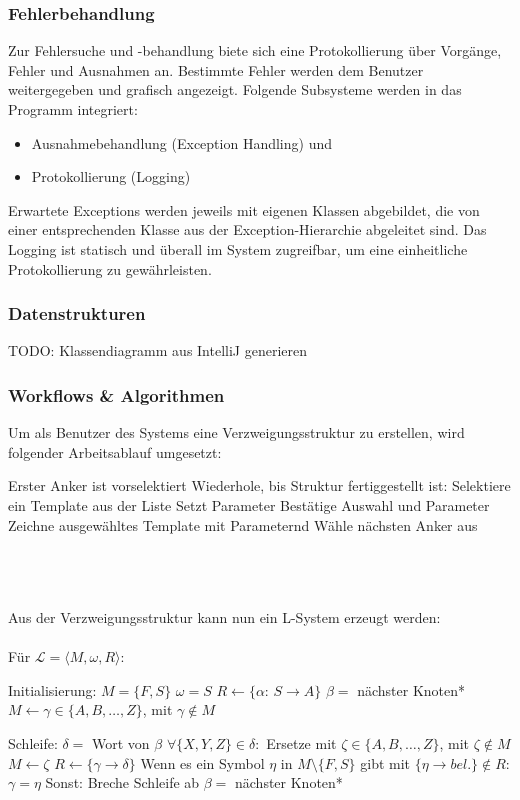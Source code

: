 \subsubsection{Fehlerbehandlung}
Zur Fehlersuche und -behandlung biete sich eine Protokollierung über Vorgänge, Fehler und Ausnahmen an.
Bestimmte Fehler werden dem Benutzer weitergegeben und grafisch angezeigt.
Folgende Subsysteme werden in das Programm integriert:
\begin{itemize}
    \item Ausnahmebehandlung (Exception Handling) und
    \item Protokollierung (Logging)
\end{itemize}
Erwartete Exceptions werden jeweils mit eigenen Klassen abgebildet, die von einer entsprechenden Klasse aus der
Exception-Hierarchie abgeleitet sind.
Das Logging ist statisch und überall im System zugreifbar, um eine einheitliche Protokollierung zu gewährleisten.

\subsubsection{Datenstrukturen}
TODO: Klassendiagramm aus IntelliJ generieren

\subsubsection{Workflows \& Algorithmen}
Um als Benutzer des Systems eine Verzweigungsstruktur zu erstellen, wird folgender Arbeitsablauf umgesetzt:
\begin{algorithm}[caption={Erstellen einer Verzweigungsstruktur}, label={alg1}]
    Erster Anker ist vorselektiert
    Wiederhole, bis Struktur fertiggestellt ist:
    Selektiere ein Template aus der Liste
    Setzt Parameter
    Bestätige Auswahl und Parameter
    Zeichne ausgewähltes Template mit Parameternd
    Wähle nächsten Anker aus
\end{algorithm}
\\~\\~\\
Aus der Verzweigungsstruktur kann nun ein L-System erzeugt werden:
\\~\\
Für $\mathcal{L}=\langle M,\omega,R \rangle$:
\begin{algorithm}[caption={Inferieren eines L-Systems aus einer Baumstruktur}, label={alg2}]
    Initialisierung:
    $M=\{F,S\}$
    $\omega=S$
    $R \gets \{\alpha$: $S \rightarrow A\}$
    $\beta=$ nächster Knoten*
    $M \gets \gamma \in \{A,B,\dots,Z\}$, mit $\gamma \notin M$

    Schleife:
    $\delta=$ Wort von $\beta$
    $\forall \{X,Y,Z\} \in \delta:$
    Ersetze mit $\zeta \in \{A,B,\dots,Z\}$, mit $\zeta \notin M$
    $M \gets \zeta$
    $R \gets \{\gamma\rightarrow\delta\}$
    Wenn es ein Symbol $\eta$ in $M\setminus\{F,S\}$ gibt mit $\{\eta \rightarrow bel.\} \notin R$:
    $\gamma=\eta$
    Sonst:
    Breche Schleife ab
    $\beta=$ nächster Knoten*
\end{algorithm}

